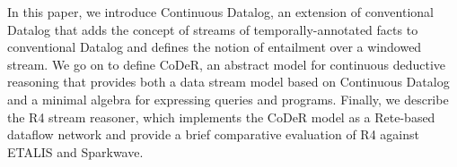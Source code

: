 In this paper, we introduce Continuous Datalog, an extension of
conventional Datalog that adds the concept of streams of
temporally-annotated facts to conventional Datalog and defines the
notion of entailment over a windowed stream. We go on to define CoDeR,
an abstract model for continuous deductive reasoning that provides
both a data stream model based on Continuous Datalog and a minimal
algebra for expressing queries and programs.  Finally, we describe the
R4 stream reasoner, which implements the CoDeR model as a Rete-based
dataflow network and provide a brief comparative evaluation of R4
against ETALIS and Sparkwave.
